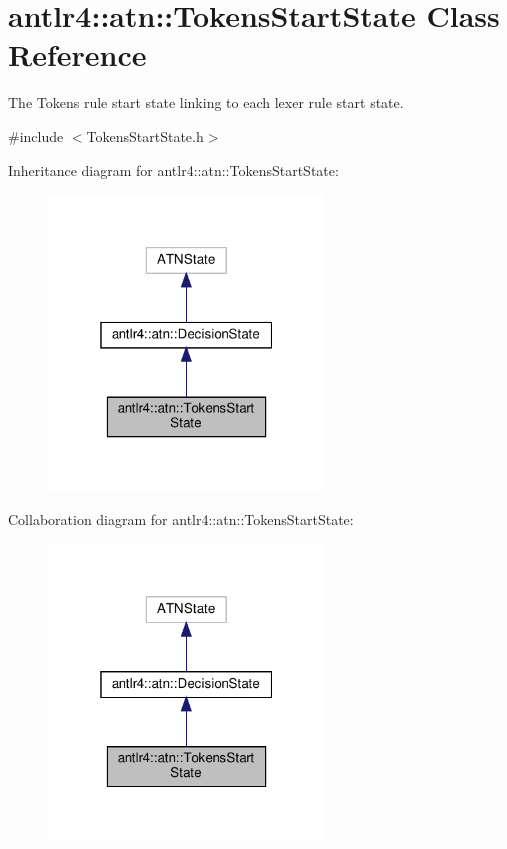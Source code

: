 \hypertarget{classantlr4_1_1atn_1_1TokensStartState}{}\section{antlr4\+:\+:atn\+:\+:Tokens\+Start\+State Class Reference}
\label{classantlr4_1_1atn_1_1TokensStartState}


The Tokens rule start state linking to each lexer rule start state.  




{\ttfamily \#include $<$Tokens\+Start\+State.\+h$>$}



Inheritance diagram for antlr4\+:\+:atn\+:\+:Tokens\+Start\+State\+:
\nopagebreak
\begin{figure}[H]
\begin{center}
\leavevmode
\includegraphics[width=208pt]{classantlr4_1_1atn_1_1TokensStartState__inherit__graph}
\end{center}
\end{figure}


Collaboration diagram for antlr4\+:\+:atn\+:\+:Tokens\+Start\+State\+:
\nopagebreak
\begin{figure}[H]
\begin{center}
\leavevmode
\includegraphics[width=208pt]{classantlr4_1_1atn_1_1TokensStartState__coll__graph}
\end{center}
\end{figure}
